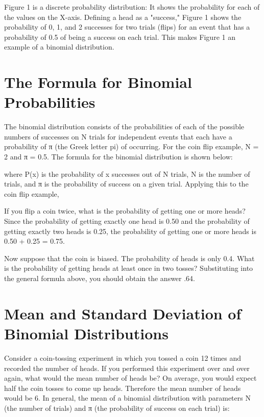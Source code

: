 \documentclass[
  11pt,
,
onecolumn,
openany
]{book}
\begin{document}
Figure 1 is a discrete probability distribution: It shows the probability for
each of the values on the X-axis. Defining a head as a "success," Figure 1
shows the probability of 0, 1, and 2 successes for two trials (flips) for an
event that has a probability of 0.5 of being a success on each trial. This
makes Figure 1 an example of a binomial distribution.

\hypertarget{the-formula-for-binomial-probabilities}{%
\section{The Formula for Binomial
Probabilities}\label{the-formula-for-binomial-probabilities}}

The binomial distribution consists of the probabilities of each of the
possible numbers of successes on N trials for independent events that each
have a probability of π (the Greek letter pi) of occurring. For the coin flip
example, N = 2 and π = 0.5. The formula for the binomial distribution is shown
below:

where P(x) is the probability of x successes out of N trials, N is the number
of trials, and π is the probability of success on a given trial. Applying this
to the coin flip example,

If you flip a coin twice, what is the probability of getting one or more
heads? Since the probability of getting exactly one head is 0.50 and the
probability of getting exactly two heads is 0.25, the probability of getting
one or more heads is 0.50 + 0.25 = 0.75.

Now suppose that the coin is biased. The probability of heads is only 0.4.
What is the probability of getting heads at least once in two tosses?
Substituting into the general formula above, you should obtain the answer .64.

\hypertarget{mean-and-standard-deviation-of-binomial-distributions}{%
\section{Mean and Standard Deviation of Binomial
Distributions}\label{mean-and-standard-deviation-of-binomial-distributions}}

Consider a coin-tossing experiment in which you tossed a coin 12 times and
recorded the number of heads. If you performed this experiment over and over
again, what would the mean number of heads be? On average, you would expect
half the coin tosses to come up heads. Therefore the mean number of heads
would be 6. In general, the mean of a binomial distribution with parameters N
(the number of trials) and π (the probability of success on each trial) is:
\end{document}
